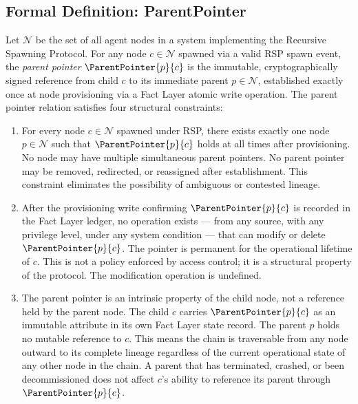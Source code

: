 \subsection{Formal Definition: ParentPointer}
\label{sec:parent-pointer-formal}

\begin{dfn}
\label{dfn:parent-pointer}
Let $\mathcal{N}$ be the set of all agent nodes in a \bxthree{} system implementing the Recursive Spawning Protocol. For any node $c \in \mathcal{N}$ spawned via a valid RSP spawn event, the \emph{parent pointer} $\ParentPointer{p}{c}$ is the immutable, cryptographically signed reference from child $c$ to its immediate parent $p \in \mathcal{N}$, established exactly once at node provisioning via a Fact Layer atomic write operation. The parent pointer relation satisfies four structural constraints:

\begin{enumerate}
    \item[(P1) \textbf{Uniqueness}] For every node $c \in \mathcal{N}$ spawned under RSP, there exists exactly one node $p \in \mathcal{N}$ such that $\ParentPointer{p}{c}$ holds at all times after provisioning. No node may have multiple simultaneous parent pointers. No parent pointer may be removed, redirected, or reassigned after establishment. This constraint eliminates the possibility of ambiguous or contested lineage.

    \item[(P2) \textbf{Immutability}] After the provisioning write confirming $\ParentPointer{p}{c}$ is recorded in the Fact Layer ledger, no operation exists — from any source, with any privilege level, under any system condition — that can modify or delete $\ParentPointer{p}{c}$. The pointer is permanent for the operational lifetime of $c$. This is not a policy enforced by access control; it is a structural property of the protocol. The modification operation is undefined.

    \item[(P3) \textbf{Directionality}] The parent pointer is an intrinsic property of the child node, not a reference held by the parent node. The child $c$ carries $\ParentPointer{p}{c}$ as an immutable attribute in its own Fact Layer state record. The parent $p$ holds no mutable reference to $c$. This means the chain is traversable from any node outward to its complete lineage regardless of the current operational state of any other node in the chain. A parent that has terminated, crashed, or been decommissioned does not affect $c$'s ability to reference its parent through $\ParentPointer{p}{c}$.


\end{enumerate}
\end{dfn}

